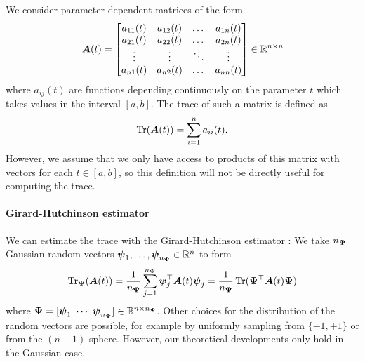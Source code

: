 \documentclass[12pt]{article}
\begin{document}
We consider parameter-dependent matrices of the form
\begin{equation}
    \boldsymbol{A}(t) = \begin{bmatrix}
        a_{11}(t) & a_{12}(t) & \dots & a_{1n}(t) \\
        a_{21}(t) & a_{22}(t) & \dots & a_{2n}(t) \\
        \vdots & \vdots & \ddots & \vdots \\
        a_{n1}(t) & a_{n2}(t) & \dots & a_{nn}(t) \\
    \end{bmatrix} \in \mathbb{R}^{n \times n}
\end{equation}
where $a_{ij}(t)$ are functions depending continuously on the parameter $t$ which takes values in the interval $[a,b]$. The trace of such a matrix is defined as
\begin{equation}
    \operatorname{Tr}(\boldsymbol{A}(t)) = \sum_{i=1}^{n} a_{ii}(t).
    \label{equ:definition-trace}
\end{equation}
However, we assume that we only have access to products of this matrix with vectors for each $t \in [a, b]$, so this definition will not be directly useful for computing the trace.

\paragraph{Girard-Hutchinson estimator} We can estimate the trace with the Girard-Hutchinson estimator \cite{girard-1989-fast-montecarlo,hutchinson-1990-stochastic-estimator}: We take $n_{\boldsymbol{\Psi}}$ Gaussian random vectors $\boldsymbol{\psi}_1,\dots, \boldsymbol{\psi}_{n_{\boldsymbol{\Psi}}} \in \mathbb{R}^{n}$ to form
\begin{equation}
    \operatorname{Tr}_{\boldsymbol{\Psi}}(\boldsymbol{A}(t))
    = \frac{1}{n_{\boldsymbol{\Psi}}} \sum_{j=1}^{n_{\boldsymbol{\Psi}}} \boldsymbol{\psi}_j^{\top} \boldsymbol{A}(t) \boldsymbol{\psi}_j
    = \frac{1}{n_{\boldsymbol{\Psi}}} \operatorname{Tr}( \boldsymbol{\Psi}^{\top} \boldsymbol{A}(t) \boldsymbol{\Psi})
    \label{equ:hutchinson-trace-estimator}
\end{equation}
where $\boldsymbol{\Psi} = [\boldsymbol{\psi}_1 ~ \cdots ~ \boldsymbol{\psi}_{n_{\boldsymbol{\Psi}}}] \in \mathbb{R}^{n \times n_{\boldsymbol{\Psi}}}$. Other choices for the distribution of the random vectors are possible, for example by uniformly sampling from $\{-1, +1\}$ or from the $(n-1)$-sphere. However, our theoretical developments only hold in the Gaussian case.
\end{document}
